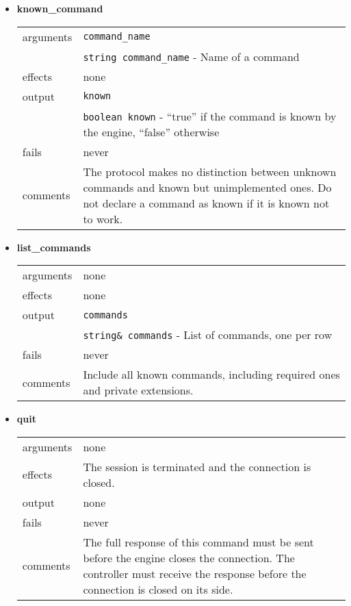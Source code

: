 \documentclass[a4paper]{article}
\begin{document}
\begin{itemize}
\item \textbf{known\_command} \\
  \begin{tabularx}{\linewidth}{lX}
    arguments & \texttt{command\_name} \\
    & \texttt{string command\_name} - Name of a command \\
    effects &   none \\
    output &    \texttt{known} \\
    & \texttt{boolean known} - ``true'' if the command is known by the
                              engine, ``false'' otherwise \\
    fails &     never \\
    comments &  The protocol makes no distinction between unknown commands
                and known but unimplemented ones. Do not declare a command
                as known if it is known not to work.
  \end{tabularx}

\item \textbf{list\_commands} \\
  \begin{tabularx}{\linewidth}{lX}
    arguments & none \\
    effects &   none \\
    output &    \texttt{commands} \\
    & \texttt{string\& commands} - List of commands, one per row \\
    fails &     never \\
    comments &  Include all known commands, including required ones and
                private extensions.
  \end{tabularx}


\item \textbf{quit} \\
  \begin{tabularx}{\linewidth}{lX}
    arguments & none \\
    effects &   The session is terminated and the connection is closed. \\
    output &    none \\
    fails &     never \\
    comments &  The full response of this command must be sent before the
                engine closes the connection. The controller must receive
                the response before the connection is closed on its side.
  \end{tabularx}
\end{itemize}
\end{document}
